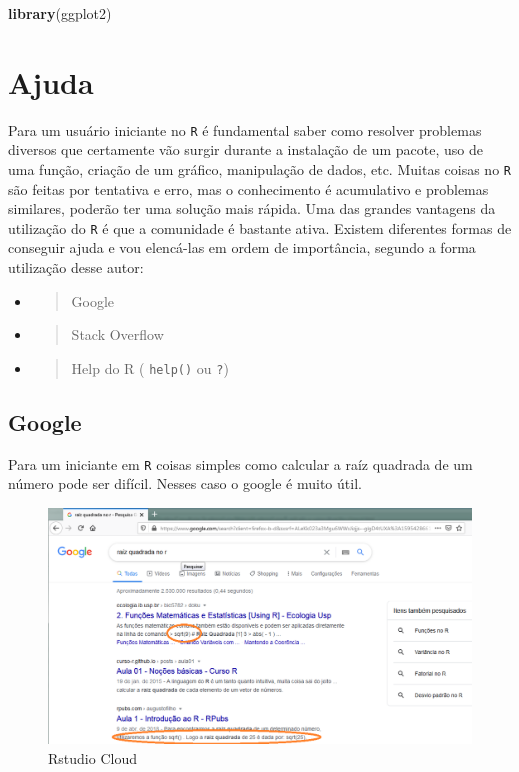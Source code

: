 \documentclass[
]{book}
\newenvironment{Shaded}{\begin{snugshade}}{\end{snugshade}}
\newcommand{\KeywordTok}[1]{\textcolor[rgb]{0.13,0.29,0.53}{\textbf{#1}}}
\newcommand{\NormalTok}[1]{#1}
\theoremstyle{definition}
\theoremstyle{definition}
\theoremstyle{definition}
\theoremstyle{remark}
\begin{document}
\begin{Shaded}
\begin{Highlighting}[]
\KeywordTok{library}\NormalTok{(ggplot2)}
\end{Highlighting}
\end{Shaded}

\hypertarget{ajuda}{%
\section{Ajuda}\label{ajuda}}

Para um usuário iniciante no \texttt{R} é fundamental saber como resolver problemas diversos que certamente vão surgir durante a instalação de um pacote, uso de uma função, criação de um gráfico, manipulação de dados, etc. Muitas coisas no \texttt{R} são feitas por tentativa e erro, mas o conhecimento é acumulativo e problemas similares, poderão ter uma solução mais rápida. Uma das grandes vantagens da utilização do \texttt{R} é que a comunidade é bastante ativa. Existem diferentes formas de conseguir ajuda e vou elencá-las em ordem de importância, segundo a forma utilização desse autor:

\begin{itemize}
\item
  \begin{quote}
  Google
  \end{quote}
\item
  \begin{quote}
  Stack Overflow
  \end{quote}
\item
  \begin{quote}
  Help do R ( \texttt{help()} ou \texttt{?})
  \end{quote}
\end{itemize}

\hypertarget{google}{%
\subsection{Google}\label{google}}

Para um iniciante em \texttt{R} coisas simples como calcular a raíz quadrada de um número pode ser difícil. Nesses caso o google é muito útil.

\begin{figure}
\includegraphics[width=0.9\linewidth]{Figuras/sqrt} \caption{Rstudio Cloud}\label{fig:sq1}
\end{figure}
\end{document}
